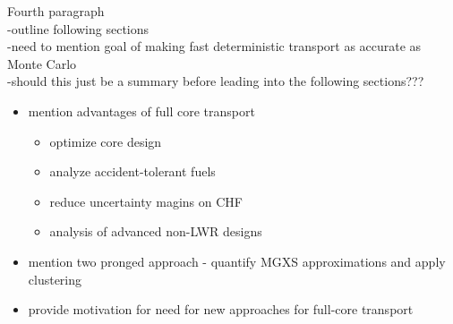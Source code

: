 Fourth paragraph\\
-outline following sections\\

-need to mention goal of making fast deterministic transport as accurate as Monte Carlo\\
-should this just be a summary before leading into the following sections???\\


\begin{itemize}
  \item mention advantages of full core transport
  \begin{itemize}
    \item optimize core design
    \item analyze accident-tolerant fuels
    \item reduce uncertainty magins on CHF
    \item analysis of advanced non-LWR designs
  \end{itemize}
\end{itemize}

\begin{itemize}[noitemsep]
  \item mention two pronged approach - quantify MGXS approximations and apply clustering
  \item provide motivation for need for new approaches for full-core transport
\end{itemize}

